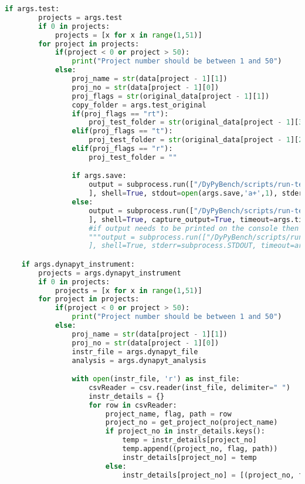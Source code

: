 \begin{lstlisting}[caption=Access Interface of DyPyBench.,label=code:dypybench.py,language=Python]
    if args.test:
        projects = args.test
        if 0 in projects:
            projects = [x for x in range(1,51)]
        for project in projects:
            if(project < 0 or project > 50):
                print("Project number should be between 1 and 50")
            else:
                proj_name = str(data[project - 1][1])
                proj_no = str(data[project - 1][0])
                proj_flags = str(original_data[project - 1][1])
                copy_folder = args.test_original
                if(proj_flags == "rt"):
                    proj_test_folder = str(original_data[project - 1][3])
                elif(proj_flags == "t"):
                    proj_test_folder = str(original_data[project - 1][2])
                elif(proj_flags == "r"):
                    proj_test_folder = ""

                if args.save:
                    output = subprocess.run(["/DyPyBench/scripts/run-test.sh %s %s %s %s %s" %(proj_name, proj_no, proj_test_folder, copy_folder, args.timeout)
                    ], shell=True, stdout=open(args.save,'a+',1), stderr=subprocess.STDOUT, timeout=args.timeout)
                else:
                    output = subprocess.run(["/DyPyBench/scripts/run-test.sh %s %s %s %s %s" %(proj_name, proj_no, proj_test_folder, copy_folder, args.timeout)
                    ], shell=True, capture_output=True, timeout=args.timeout)
                    #if output needs to be printed on the console then comment above and uncomment below
                    """output = subprocess.run(["/DyPyBench/scripts/run-test.sh %s %s %s %s %s" %(proj_name, proj_no, proj_test_folder, copy_folder, args.timeout)
                    ], shell=True, stderr=subprocess.STDOUT, timeout=args.timeout)"""

    if args.dynapyt_instrument:
        projects = args.dynapyt_instrument
        if 0 in projects:
            projects = [x for x in range(1,51)]
        for project in projects:
            if(project < 0 or project > 50):
                print("Project number should be between 1 and 50")
            else:
                proj_name = str(data[project - 1][1])
                proj_no = str(data[project - 1][0])
                instr_file = args.dynapyt_file
                analysis = args.dynapyt_analysis

                with open(instr_file, 'r') as inst_file:
                    csvReader = csv.reader(inst_file, delimiter=" ")
                    instr_details = {}
                    for row in csvReader:
                        project_name, flag, path = row
                        project_no = get_project_no(project_name)
                        if project_no in instr_details.keys():
                            temp = instr_details[project_no]
                            temp.append((project_no, flag, path))
                            instr_details[project_no] = temp
                        else:
                            instr_details[project_no] = [(project_no, flag, path)]


\end{lstlisting}
